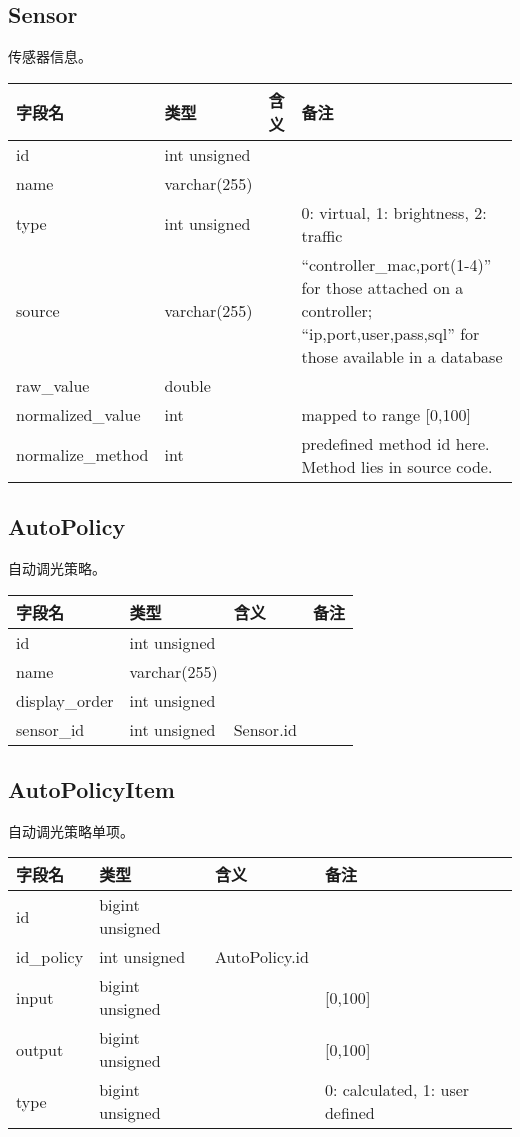 \subsection{Sensor}\label{sensor}

传感器信息。

\begin{longtabu}[c]{@{}lXXX@{}}
\toprule
字段名 & 类型 & 含义 & 备注\tabularnewline
\midrule
\endhead
id & int unsigned & &\tabularnewline
name & varchar(255) & &\tabularnewline
type & int unsigned & & 0: virtual, 1: brightness, 2:
traffic\tabularnewline
source & varchar(255) & & ``controller\_mac,port(1-4)'' for those
attached on a controller; ``ip,port,user,pass,sql'' for those available
in a database\tabularnewline
raw\_value & double & &\tabularnewline
normalized\_value & int & & mapped to range {[}0,100{]}\tabularnewline
normalize\_method & int & & predefined method id here. Method lies in
source code.\tabularnewline
\bottomrule
\end{longtabu}

\subsection{AutoPolicy}\label{autopolicy}

自动调光策略。

\begin{longtabu}[c]{@{}lXXX@{}}
\toprule
字段名 & 类型 & 含义 & 备注\tabularnewline
\midrule
\endhead
id & int unsigned & &\tabularnewline
name & varchar(255) & &\tabularnewline
display\_order & int unsigned & &\tabularnewline
sensor\_id & int unsigned & Sensor.id &\tabularnewline
\bottomrule
\end{longtabu}

\subsection{AutoPolicyItem}\label{autopolicyitem}

自动调光策略单项。

\begin{longtabu}[c]{@{}lXXX@{}}
\toprule
字段名 & 类型 & 含义 & 备注\tabularnewline
\midrule
\endhead
id & bigint unsigned & &\tabularnewline
id\_policy & int unsigned & AutoPolicy.id &\tabularnewline
input & bigint unsigned & & {[}0,100{]}\tabularnewline
output & bigint unsigned & & {[}0,100{]}\tabularnewline
type & bigint unsigned & & 0: calculated, 1: user defined\tabularnewline
\bottomrule
\end{longtabu}

